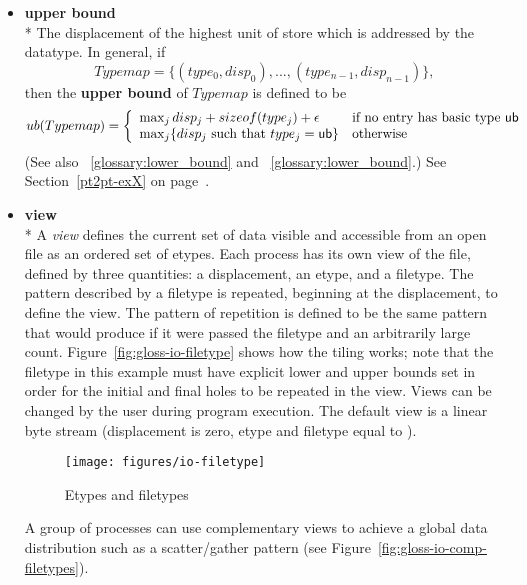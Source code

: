 \begin{itemize}
\label{glossary:upper_bound}
\item \textbf{ upper bound} \\*
The displacement of the highest unit of store which is addressed by the datatype. 
In general, if
\begin{displaymath}
Typemap = \{ (type_0 , disp_0 ) , ... , (type_{n-1} , disp_{n-1}) \} ,
\end{displaymath}
then the {\bf upper bound} of $Typemap$ is defined to be
\[
ub(Typemap) = \left\{ \begin{array}{ll}
\max_j disp_j + sizeof(type_j) + \epsilon & \mbox{if no entry has basic type
{\sf ub}}
\\ \max_j \{ disp_j \ \mbox{such that}\ type_j = {\sf ub} \} & \mbox{otherwise}
\end{array}
\right. \]
(See also ~\ref{glossary:lower_bound} and ~\ref{glossary:lower_bound}.)
See Section~\ref{pt2pt-exX} on page~\pageref{pt2pt-exX}.

\label{glossary:view}
\item \textbf{ view} \\*
A {\it view} defines the current set of data visible
and accessible from an open file as an ordered set of etypes.
Each process has its own view of the file,
defined by three quantities:
a displacement, an etype, and a filetype.
The pattern described by a filetype is repeated,
beginning at the displacement, to define the view.
The pattern of repetition is defined to be the same pattern
that  would produce if it were passed
the filetype and an arbitrarily large count.
Figure~\ref{fig:gloss-io-filetype} shows how the tiling works; note 
that the filetype in this example must have explicit 
lower and upper bounds set in order for the initial and final holes to be
repeated in the view.
Views can be changed by the user during program execution.
The default view is a linear byte stream
(displacement is zero, etype and filetype equal to ).

\begin{figure}[htpb]
  \centerline{\texttt{[image: figures/io-filetype]}}
  \caption{Etypes and filetypes}
  \label{fig:glossary-io-filetype}
\end{figure}

A group of processes can use complementary views to
achieve a global data distribution such as a scatter/gather pattern
(see Figure~\ref{fig:gloss-io-comp-filetypes}).


\end{itemize}
